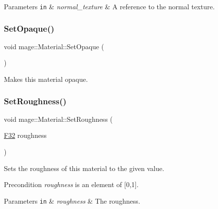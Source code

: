 \begin{DoxyParams}[1]{Parameters}
\mbox{\tt in}  & {\em normal\+\_\+texture} & A reference to the normal texture. \\
\hline
\end{DoxyParams}
\hypertarget{structmage_1_1_material_ab3c49ab54603adebb1d08803fc700fc9}{}\label{structmage_1_1_material_ab3c49ab54603adebb1d08803fc700fc9} 
\subsubsection{\texorpdfstring{Set\+Opaque()}{SetOpaque()}}
{\footnotesize\ttfamily void mage\+::\+Material\+::\+Set\+Opaque (\begin{DoxyParamCaption}{ }\end{DoxyParamCaption})\hspace{0.3cm}{\ttfamily [noexcept]}}

Makes this material opaque. \hypertarget{structmage_1_1_material_ad1df4026da1b5abc3924c7ce09a81a02}{}\label{structmage_1_1_material_ad1df4026da1b5abc3924c7ce09a81a02} 
\subsubsection{\texorpdfstring{Set\+Roughness()}{SetRoughness()}}
{\footnotesize\ttfamily void mage\+::\+Material\+::\+Set\+Roughness (\begin{DoxyParamCaption}\item[{\hyperlink{namespacemage_aa97e833b45f06d60a0a9c4fc22ae02c0}{F32}}]{roughness }\end{DoxyParamCaption})\hspace{0.3cm}{\ttfamily [noexcept]}}

Sets the roughness of this material to the given value.

\begin{DoxyPrecond}{Precondition}
{\itshape roughness} is an element of \mbox{[}0,1\mbox{]}. 
\end{DoxyPrecond}

\begin{DoxyParams}[1]{Parameters}
\mbox{\tt in}  & {\em roughness} & The roughness. \\
\hline
\end{DoxyParams}
\hypertarget{structmage_1_1_material_abf7e618017185ea05c72d050e89018fe}{}\label{structmage_1_1_material_abf7e618017185ea05c72d050e89018fe} 
